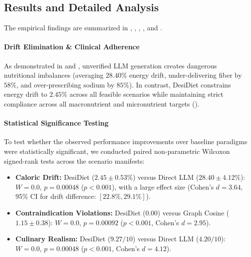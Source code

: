 \documentclass[5p,times,twocolumn]{elsarticle}
\makeatletter
\def\systemname{DesiDiet}%
\def\my@bx{bx}
\def\my@b{b}
\DeclareRobustCommand{\systemname}{%
  \texorpdfstring{%
    \ifx\f@series\my@bx
      DesiDiet%
    \else\ifx\f@series\my@b
      DesiDiet%
    \else
      \textsc{DesiDiet}%
    \fi\fi
  }{DesiDiet}%
}
\makeatother
\begin{document}
\subsection{Results and Detailed Analysis}
The empirical findings are summarized in , , , , and .

\paragraph{Drift Elimination \& Clinical Adherence}
As demonstrated in  and , unverified LLM generation creates dangerous nutritional imbalances (averaging $28.40\%$ energy drift, under-delivering fiber by $58\%$, and over-prescribing sodium by $85\%$). In contrast, \systemname{} constrains energy drift to $2.45\%$ across all feasible scenarios while maintaining strict compliance across all macronutrient and micronutrient targets ().

\paragraph{Statistical Significance Testing}
To test whether the observed performance improvements over baseline paradigms were statistically significant, we conducted paired non-parametric Wilcoxon signed-rank tests across the scenario manifests:
\begin{itemize}[leftmargin=*,itemsep=1.5pt]
  \item \textbf{Caloric Drift:} \systemname{} ($2.45 \pm 0.53\%$) versus Direct LLM ($28.40 \pm 4.12\%$): $W = 0.0$, $p = 0.00048$ ($p < 0.001$), with a large effect size (Cohen's $d = 3.64$, 95\% CI for drift difference: $[22.8\%, 29.1\%]$).
  \item \textbf{Contraindication Violations:} \systemname{} ($0.00$) versus Graph Cosine ($1.15 \pm 0.38$): $W = 0.0$, $p = 0.00092$ ($p < 0.001$, Cohen's $d = 2.95$).
  \item \textbf{Culinary Realism:} \systemname{} ($9.27 / 10$) versus Direct LLM ($4.20 / 10$): $W = 0.0$, $p = 0.00048$ ($p < 0.001$, Cohen's $d = 4.12$).
\end{itemize}
\end{document}
